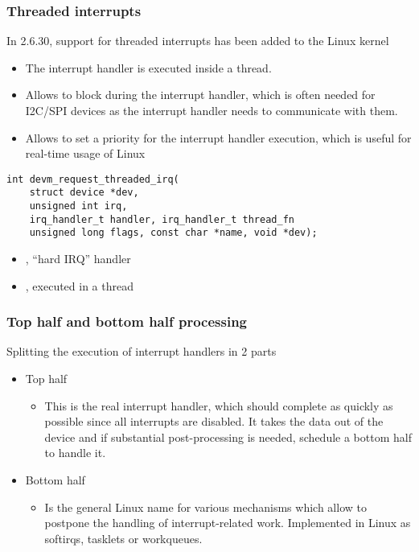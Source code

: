 \begin{frame}[fragile]
  \frametitle{Threaded interrupts}
  In 2.6.30, support for threaded interrupts has been added to
  the Linux kernel
  \begin{itemize}
  \item The interrupt handler is executed inside a thread.
  \item Allows to block during the interrupt handler, which is often
        needed for I2C/SPI devices as the interrupt handler needs to
        communicate with them.
  \item Allows to set a priority for the interrupt handler
        execution, which is useful for real-time usage of Linux
  \end{itemize}
  \begin{verbatim}
int devm_request_threaded_irq(
    struct device *dev,
    unsigned int irq,
    irq_handler_t handler, irq_handler_t thread_fn
    unsigned long flags, const char *name, void *dev);
  \end{verbatim}
  \begin{itemize}
  \item {}, ``hard IRQ'' handler
  \item {}, executed in a thread
  \end{itemize}
\end{frame}

\begin{frame}
  \frametitle{Top half and bottom half processing}
  Splitting the execution of interrupt handlers in 2 parts
  \begin{itemize}
  \item Top half
    \begin{itemize}
    \item This is the real interrupt handler, which should complete
      as quickly as possible since all interrupts are disabled.
      It takes the data out of the device and if substantial
      post-processing is needed, schedule a bottom half to handle it. 
    \end{itemize}
  \item Bottom half
    \begin{itemize}
    \item Is the general Linux name for various mechanisms which
      allow to postpone the handling of interrupt-related
      work. Implemented in Linux as softirqs, tasklets or
      workqueues.
    \end{itemize}
  \end{itemize}
\end{frame}

